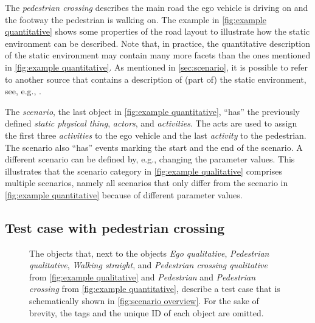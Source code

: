 The \textit{pedestrian crossing} describes the main road the ego vehicle is driving on and the footway the pedestrian is walking on. The example in \cref{fig:example quantitative} shows some properties of the road layout to illustrate how the static environment can be described. Note that, in practice, the quantitative description of the static environment may contain many more facets than the ones mentioned in \cref{fig:example quantitative}. As mentioned in \cref{sec:scenario}, it is possible to refer to another source that contains a description of (part of) the static environment, see, e.g., \autocite{dupuis2010opendrive}. 

The \textit{scenario}, the last object in \cref{fig:example quantitative}, ``has'' the previously defined \cstartc\textit{static physical thing}\cendc, \textit{actors}, and \textit{activities}. The acts are used to assign the first three \textit{activities} to the ego vehicle and the last \textit{activity} to the pedestrian. 
The scenario also ``has'' \cstartb events marking the start and the end of the scenario\cendb.
A different scenario can be defined by, e.g., changing the parameter values. This illustrates that the scenario category in \cref{fig:example qualitative} comprises multiple scenarios, namely all scenarios that only differ from the scenario in \cref{fig:example quantitative} because of different parameter values.



\subsection{Test case with pedestrian crossing}
\label{sec:example test case}


\begin{figure}[t]
	\centering
	
	\caption{The objects that, next to the objects \emph{Ego qualitative}, \emph{Pedestrian qualitative}, \emph{Walking straight}, and \emph{Pedestrian crossing qualitative} from \cref{fig:example qualitative} and \emph{Pedestrian} and \emph{Pedestrian crossing} from \cref{fig:example quantitative}, describe a test case that is schematically shown in \cref{fig:scenario overview}. For the sake of brevity, the tags and the unique ID of each object are omitted.}
	\label{fig:example test case}
\end{figure}


